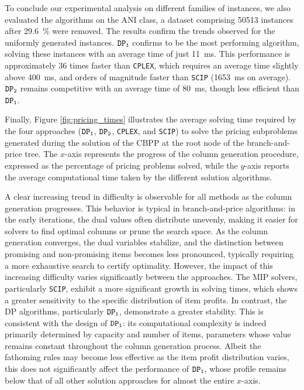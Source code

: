 \documentclass[preprint,11pt]{elsarticle}
\newcommand{\firstDP}{{\tt DP_1}}
\newcommand{\secondDP}{{\tt DP_2}}
\theoremstyle{definition}
\begin{document}
\medskip

To conclude our experimental analysis on different families of instances, we also evaluated the algorithms on the ANI class, a dataset comprising \num{50513} instances after \SI{29.6}{\percent} were removed. The results confirm the trends observed for the uniformly generated instances. $\firstDP$ confirms to be the most performing algorithm, solving these instances with an average time of just \qty{11}{\milli\second}.
This performance is approximately $36$ times faster than {\tt CPLEX}, which requires an average time slightly above \qty{400}{\milli\second}, and orders of magnitude faster than {\tt SCIP} (\qty{1653}{\milli\second} on average).
$\secondDP$ remains competitive with an average time of \qty{80}{\milli\second}, though less efficient than $\firstDP$. 

Finally, Figure \ref{fig:pricing_times} illustrates the average solving time required by the four approaches ($\firstDP$, $\secondDP$, {\tt CPLEX}, and {\tt SCIP}) to solve the pricing subproblems generated during the solution of the CBPP at the root node of the branch-and-price tree. The $x$-axis represents the progress of the column generation procedure, expressed as the percentage of pricing problems solved, while the $y$-axis reports the average computational time taken by the different solution algorithms.

A clear increasing trend in difficulty is observable for all methods as the column generation progresses. This behavior is typical in branch-and-price algorithms: in the early iterations, the dual values often distribute unevenly, making it easier for solvers to find optimal columns or prune the search space. As the column generation converges, the dual variables stabilize, and the distinction between promising and non-promising items becomes less pronounced, typically requiring a more exhaustive search to certify optimality.
However, the impact of this increasing difficulty varies significantly between the approaches. The MIP solvers, particularly {\tt SCIP}, exhibit a more significant growth in solving times, which shows a greater sensitivity to the specific distribution of item profits. In contrast, the DP algorithms, particularly $\firstDP$, demonstrate a greater stability. This is consistent with the design of $\firstDP$: its computational complexity is indeed primarily determined by capacity and number of items, parameters whose value remains constant throughout the column generation process. Albeit the fathoming rules may become less effective as the item profit distribution varies, this does not significantly affect the performance of $\firstDP$, whose profile remains below that of all other solution approaches for almost the entire $x$-axis.
\end{document}
